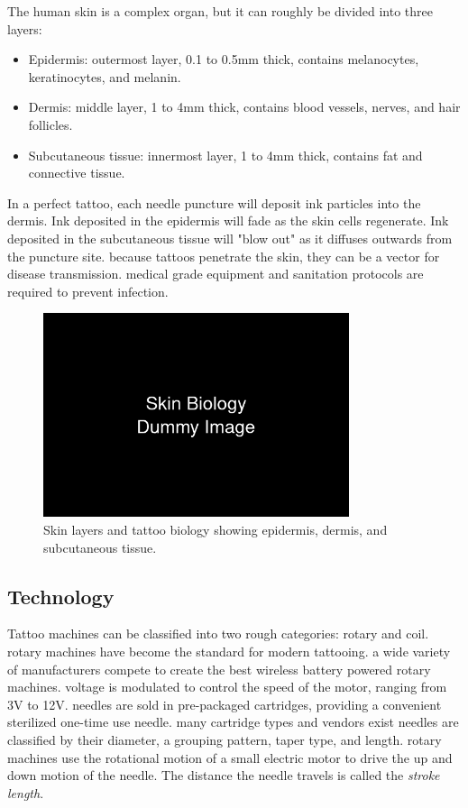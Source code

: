 \documentclass[11pt]{article}
\begin{document}
The human skin is a complex organ, but it can roughly be divided into three layers:

\begin{itemize}
    \item Epidermis: outermost layer, 0.1 to 0.5mm thick, contains melanocytes, keratinocytes, and melanin.
    \item Dermis: middle layer, 1 to 4mm thick, contains blood vessels, nerves, and hair follicles.
    \item Subcutaneous tissue: innermost layer, 1 to 4mm thick, contains fat and connective tissue.
\end{itemize}

In a perfect tattoo, each needle puncture will deposit ink particles into the dermis.
Ink deposited in the epidermis will fade as the skin cells regenerate.
Ink deposited in the subcutaneous tissue will "blow out" as it diffuses outwards from the puncture site.
because tattoos penetrate the skin, they can be a vector for disease transmission.
medical grade equipment and sanitation protocols are required to prevent infection.

\begin{figure}[h]
    \centering
    \includegraphics[width=0.8\textwidth]{figures/biology.png}
    \caption{Skin layers and tattoo biology showing epidermis, dermis, and subcutaneous tissue.}
    \label{fig:biology}
\end{figure}

\pagebreak

\subsection{Technology}

Tattoo machines can be classified into two rough categories: rotary and coil.
rotary machines have become the standard for modern tattooing.
a wide variety of manufacturers compete to create the best wireless battery powered rotary machines.
voltage is modulated to control the speed of the motor, ranging from 3V to 12V.
needles are sold in pre-packaged cartridges, providing a convenient sterilized one-time use needle.
many cartridge types and vendors exist
needles are classified by their diameter, a grouping pattern, taper type, and length.
rotary machines use the rotational motion of a small electric motor to drive the up and down motion of the needle.
The distance the needle travels is called the \textit{stroke length}.
\end{document}
